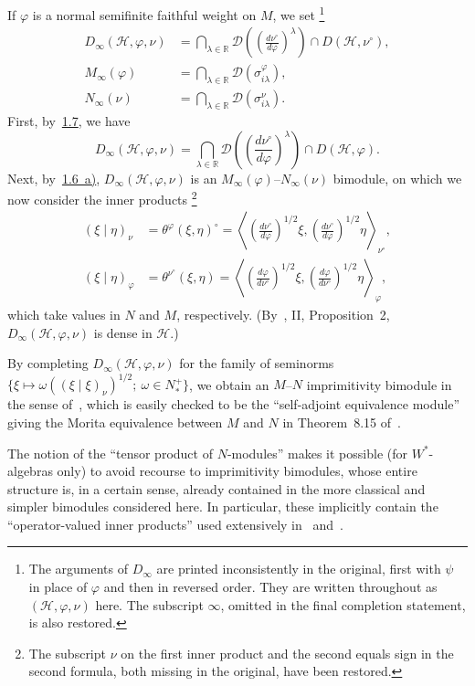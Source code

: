 \documentclass[fontsize=13pt,twoside,headings=small,bookmarkpackage=false]{scrartcl}
\newcommand{\HH}{\mathcal H}
\newcounter{translatornote}
\newcommand{\tfnote}[1]{\stepcounter{translatornote}\begingroup
  \renewcommand{\thefootnote}{T\arabic{translatornote}}\footnote{#1}\endgroup}
\begin{document}
If $\varphi$ is a normal semifinite faithful weight on $M$, we set\tfnote{The arguments of $D_\infty$ are printed inconsistently in the original, first with $\psi$ in place of $\varphi$ and then in reversed order. They are written throughout as $(\HH,\varphi,\nu)$ here. The subscript $\infty$, omitted in the final completion statement, is also restored.}
\begin{align*}
 D_\infty(\HH,\varphi,\nu)
 &=\bigcap_{\lambda\in\mathbb R}
 \mathcal D\left(\left(\frac{d\nu^\circ}{d\varphi}\right)^\lambda\right)
 \cap D(\HH,\nu^\circ),\\
 M_\infty(\varphi)&=\bigcap_{\lambda\in\mathbb R}\mathcal D(\sigma^\varphi_{i\lambda}),\\
 N_\infty(\nu)&=\bigcap_{\lambda\in\mathbb R}\mathcal D(\sigma^\nu_{i\lambda}).
\end{align*}
First, by~\hyperref[p:1.7]{1.7}, we have
\[
 D_\infty(\HH,\varphi,\nu)
 =\bigcap_{\lambda\in\mathbb R}
 \mathcal D\left(\left(\frac{d\nu^\circ}{d\varphi}\right)^\lambda\right)
 \cap D(\HH,\varphi).
\]
Next, by~\hyperlink{eq:1.6a}{1.6~a)}, $D_\infty(\HH,\varphi,\nu)$ is an $M_\infty(\varphi)$--$N_\infty(\nu)$ bimodule, on which we now consider the inner products\tfnote{The subscript $\nu$ on the first inner product and the second equals sign in the second formula, both missing in the original, have been restored.}
\begin{align*}
 (\xi\mid\eta)_\nu
 &=\theta^\varphi(\xi,\eta)^\circ
 =\left\langle\left(\frac{d\nu^\circ}{d\varphi}\right)^{1/2}\xi,
 \left(\frac{d\nu^\circ}{d\varphi}\right)^{1/2}\eta\right\rangle_{\nu^\circ},\\
 (\xi\mid\eta)_\varphi
 &=\theta^{\nu^\circ}(\xi,\eta)
 =\left\langle\left(\frac{d\varphi}{d\nu^\circ}\right)^{1/2}\xi,
 \left(\frac{d\varphi}{d\nu^\circ}\right)^{1/2}\eta\right\rangle_\varphi,
\end{align*}
which take values in $N$ and $M$, respectively. (By~\cite{5}, II, Proposition~2, $D_\infty(\HH,\varphi,\nu)$ is dense in $\HH$.)

By completing $D_\infty(\HH,\varphi,\nu)$ for the family of seminorms
$\{\xi\mapsto\omega((\xi\mid\xi)_\nu)^{1/2};\ \omega\in N_*^+\}$,
we obtain an $M$--$N$ imprimitivity bimodule in the sense of~\cite{7}, which is easily checked to be the ``self-adjoint equivalence module'' giving the Morita equivalence between $M$ and $N$ in Theorem~8.15 of~\cite{7}.

The notion of the ``tensor product of $N$-modules'' makes it possible (for $W^*$-algebras only) to avoid recourse to imprimitivity bimodules, whose entire structure is, in a certain sense, already contained in the more classical and simpler bimodules considered here. In particular, these implicitly contain the ``operator-valued inner products'' used extensively in~\cite{1} and~\cite{7}.
\end{document}
